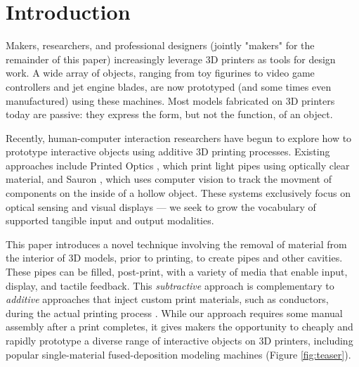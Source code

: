 
\section{Introduction}
Makers, researchers, and professional designers (jointly "makers" for the remainder of this paper) increasingly leverage 3D printers as tools for design work.  A wide array of objects, ranging from toy figurines to video game controllers and jet engine blades, are now prototyped (and some times even manufactured) using these machines.  Most models fabricated on 3D printers today are passive: they express the form, but not the function, of an object.  

Recently, human-computer interaction researchers have begun to explore how to prototype interactive objects using additive 3D printing processes.
Existing approaches include Printed Optics \cite{Willis-printedoptics}, which print light pipes using optically clear material, and Sauron \cite{Savage-sauron}, which uses computer vision to track the movment of components on the inside of a hollow object. These systems exclusively focus on optical sensing and visual displays --- we seek to grow the vocabulary of supported tangible input and output modalities.

This paper introduces a novel technique involving the removal of material from the interior of 3D models, prior to printing, to create pipes and other cavities.  These pipes can be filled, post-print, with a variety of media that enable input, display, and tactile feedback.  This {\em subtractive} approach is complementary to {\em additive} approaches that inject custom print materials, such as conductors, during the actual printing process \cite{Sells-reprap}. While our approach requires some manual assembly after a print completes, it gives makers the opportunity to cheaply and rapidly prototype a diverse range of interactive objects on 3D printers, including popular single-material fused-deposition modeling machines (Figure \ref{fig:teaser}).

